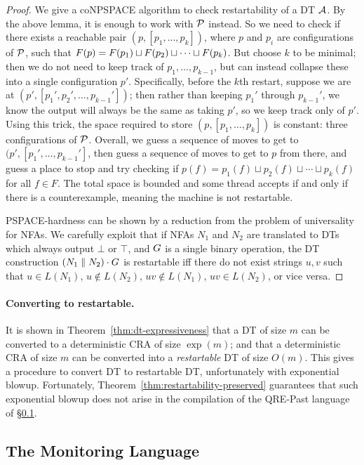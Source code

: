 \begin{proof}
We give a coNPSPACE algorithm to check restartability of a DT $\mathcal{A}$. By the above lemma, it is enough to work with $\mathcal{P}$ instead.
So we need to check if there exists
a reachable pair $(p, [p_1,\ldots,p_k])$,
where $p$ and $p_i$ are configurations of $\mathcal{P}$,
such that
$F(p) = F(p_1) \sqcup F(p_2) \sqcup \cdots \sqcup F(p_k)$.
But choose $k$ to be minimal;
then we do not need to keep track of $p_1, \ldots, p_{k-1}$,
but can instead collapse these into a single configuration $p'$.
Specifically, before the $k$th restart,
suppose we are at $(p', [p_1',p_2',\ldots, p_{k-1}'])$;
then rather than keeping $p_1'$ through $p_{k-1}'$,
we know the output will always be the same as taking $p'$,
so we keep track only of $p'$.
Using this trick, the space required to store
$(p, [p_1, \ldots, p_k])$ is constant: three configurations of $\mathcal{P}$.
Overall, we guess a sequence of moves to get
to $(p', [p_1', \ldots, p_{k-1}']$,
then guess a sequence of moves to get to $p$ from there,
and guess a place to stop and try checking if
$p(f) = p_1(f) \sqcup p_2(f) \sqcup \cdots \sqcup p_k(f)$ for all $f \in F$.
The total space is bounded and some thread accepts if and only if there is a counterexample,
meaning the machine is not restartable.

PSPACE-hardness can be shown by a reduction from the problem of universality for NFAs.
We carefully exploit that if
NFAs $N_1$ and $N_2$ are translated to DTs which always output $\bot$ or $\top$,
and $G$ is a single binary operation,
the DT construction $(N_1 \; \| \; N_2) \cdot G$ is restartable iff
there do not exist strings $u, v$ such that
$u \in L(N_1)$, $u \notin L(N_2)$, $uv \notin L(N_1)$, $uv \in L(N_2)$, or vice versa.
\end{proof}

\paragraph*{Converting to restartable.}
It is shown in Theorem~\ref{thm:dt-expressiveness} that a DT of size $m$ can be converted to a deterministic CRA of size $\exp(m)$; and that a deterministic CRA of size $m$ can be converted into a \emph{restartable} DT of size $O(m)$. This gives a procedure to convert DT to restartable DT, unfortunately with exponential blowup. Fortunately, Theorem~\ref{thm:restartability-preserved} guarantees that such exponential blowup does not arise in the compilation of the QRE-Past language of \S\ref{sec:rm}.

\subsection{The \QREpast{} Monitoring Language}
\label{sec:rm}


